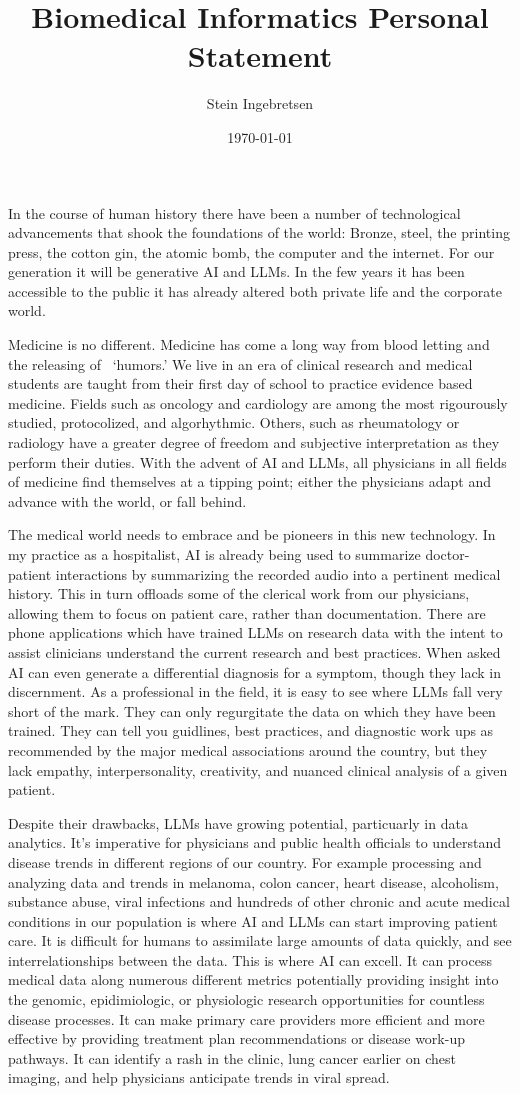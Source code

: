 \documentclass[12pt]{extarticle}
\title{Biomedical Informatics Personal Statement}
\author{Stein Ingebretsen}
\date{\today}                                           %
\begin{document}
In the course of human history there have been a number of technological advancements that shook the foundations of the world: Bronze, steel, the printing press, the cotton gin, the atomic bomb, the computer and the internet. For our generation it will be generative AI and LLMs. In the few years it has been accessible to the public it has already altered both private life and the corporate world.  

Medicine is no different. Medicine has come a long way from blood letting and the releasing of~ ‘humors.’ We live in an era of clinical research and medical students are taught from their first day of school to practice evidence based medicine. Fields such as oncology and cardiology are among the most rigourously studied, protocolized, and algorhythmic. Others, such as rheumatology or radiology have a greater degree of freedom and subjective interpretation as they perform their duties. With the advent of AI and LLMs, all physicians in all fields of medicine find themselves at a tipping point; either the physicians adapt and advance with the world, or fall behind. 

The medical world needs to embrace and be pioneers in this new technology. In my practice as a hospitalist, AI is already being used to summarize doctor-patient interactions by summarizing the recorded audio into a pertinent medical history. This in turn offloads some of the clerical work from our physicians, allowing them to focus on patient care, rather than documentation. There are phone applications which have trained LLMs on research data with the intent to assist clinicians understand the current research and best practices. When asked AI can even generate a differential diagnosis for a symptom, though they lack in discernment. As a professional in the field, it is easy to see where LLMs fall very short of the mark. They can only regurgitate the data on which they have been trained. They can tell you guidlines, best practices, and diagnostic work ups as recommended by the major medical associations around the country, but they lack empathy, interpersonality, creativity, and nuanced clinical analysis of a given patient.

Despite their drawbacks, LLMs have growing potential, particuarly in data analytics. It's imperative for physicians and public health officials to understand disease trends in different regions of our country. For example processing and analyzing data and trends in melanoma, colon cancer, heart disease, alcoholism, substance abuse, viral infections and hundreds of other chronic and acute medical conditions in our population is where AI and LLMs can start improving patient care. It is difficult for humans to assimilate large amounts of data quickly, and see interrelationships between the data. This is where AI can excell. It can process medical data along numerous different metrics potentially providing insight into the genomic, epidimiologic, or physiologic research opportunities for countless disease processes. It can make primary care providers more efficient and more effective by providing treatment plan recommendations or disease work-up pathways. It can identify a rash in the clinic, lung cancer earlier on chest imaging, and help physicians anticipate trends in viral spread.
\end{document}
